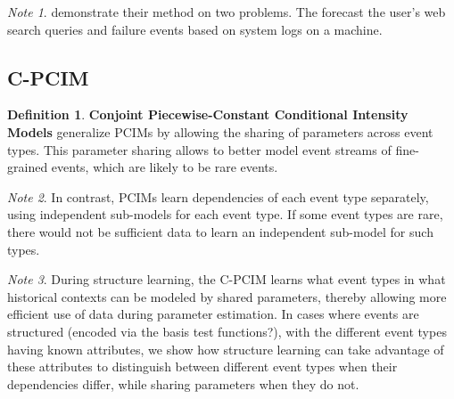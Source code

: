 \documentclass[12pt]{article}
\theoremstyle{plain}
\theoremstyle{definition}
\newtheorem{definition}{Definition}
\theoremstyle{remark}
\newtheorem*{note}{Note}
\begin{document}
\begin{note}
  \cite{gunmeexu11} demonstrate their method on two problems. The forecast the
  user's web search queries and failure events based on system logs on a
  machine.
\end{note}

\subsection{C-PCIM}

\begin{definition}
  \textbf{Conjoint Piecewise-Constant Conditional Intensity Models} generalize
  PCIMs by allowing the sharing of parameters across event types. This parameter
  sharing allows to better model event streams of fine-grained events, which
  are likely to be rare events.
\end{definition}

\begin{note}
  In contrast, PCIMs learn dependencies of each event type separately, using
  independent sub-models for each event type. If some event types are rare,
  there would not be sufficient data to learn an independent sub-model for
  such types.
\end{note}

\begin{note}
  During structure learning, the C-PCIM learns what event types in what
  historical contexts can be modeled by shared parameters, thereby allowing more
  efficient use of data during parameter estimation. In cases where events are
  structured (encoded via the basis test functions?), with the different event
  types having known attributes, we show how structure learning can take
  advantage of these attributes to distinguish between different event types
  when their dependencies differ, while sharing parameters when they do not.
\end{note}



\end{document}
